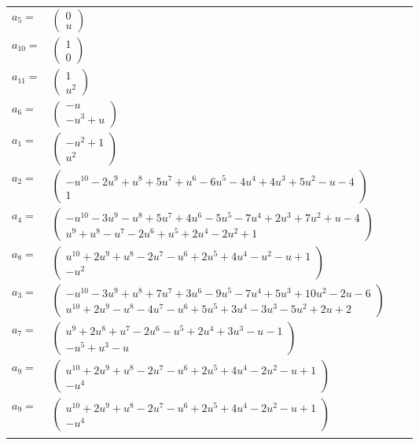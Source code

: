 \documentclass[1p]{elsarticle_modified}
\theoremstyle{definition}
\begin{document}
\begin{tabular}{m{7pt} m{180pt} m{7pt} m{180pt} }
\flushright $a_{5}=$&$\begin{pmatrix}0\\u\end{pmatrix}$ \\
\flushright $a_{10}=$&$\begin{pmatrix}1\\0\end{pmatrix}$ \\
\flushright $a_{11}=$&$\begin{pmatrix}1\\u^2\end{pmatrix}$ \\
\flushright $a_{6}=$&$\begin{pmatrix}- u\\- u^3+u\end{pmatrix}$ \\
\flushright $a_{1}=$&$\begin{pmatrix}- u^2+1\\u^2\end{pmatrix}$ \\
\flushright $a_{2}=$&$\begin{pmatrix}- u^{10}-2 u^9+u^8+5 u^7+u^6-6 u^5-4 u^4+4 u^3+5 u^2- u-4\\1\end{pmatrix}$ \\
\flushright $a_{4}=$&$\begin{pmatrix}- u^{10}-3 u^9- u^8+5 u^7+4 u^6-5 u^5-7 u^4+2 u^3+7 u^2+u-4\\u^9+u^8- u^7-2 u^6+u^5+2 u^4-2 u^2+1\end{pmatrix}$ \\
\flushright $a_{8}=$&$\begin{pmatrix}u^{10}+2 u^9+u^8-2 u^7- u^6+2 u^5+4 u^4- u^2- u+1\\- u^2\end{pmatrix}$ \\
\flushright $a_{3}=$&$\begin{pmatrix}- u^{10}-3 u^9+u^8+7 u^7+3 u^6-9 u^5-7 u^4+5 u^3+10 u^2-2 u-6\\u^{10}+2 u^9- u^8-4 u^7- u^6+5 u^5+3 u^4-3 u^3-5 u^2+2 u+2\end{pmatrix}$ \\
\flushright $a_{7}=$&$\begin{pmatrix}u^9+2 u^8+u^7-2 u^6- u^5+2 u^4+3 u^3- u-1\\- u^5+u^3- u\end{pmatrix}$ \\
\flushright $a_{9}=$&$\begin{pmatrix}u^{10}+2 u^9+u^8-2 u^7- u^6+2 u^5+4 u^4-2 u^2- u+1\\- u^4\end{pmatrix}$\\ \flushright $a_{9}=$&$\begin{pmatrix}u^{10}+2 u^9+u^8-2 u^7- u^6+2 u^5+4 u^4-2 u^2- u+1\\- u^4\end{pmatrix}$\\&\end{tabular}
\end{document}
